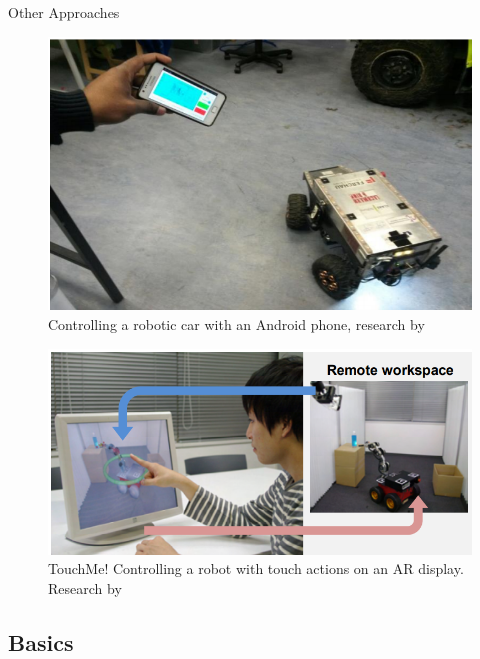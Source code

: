 \documentclass[t]{beamer}
\begin{document}
\begin{frame}{Other Approaches}

\begin{minipage}{0.49\linewidth}
\begin{figure}
	\includegraphics[width=\linewidth]{assets/pres/akupati.png}
	\caption{Controlling a robotic car with an Android phone, research by \citeauthor{Akupati2017}\cite{Akupati2017}}
\end{figure}
\end{minipage}
\begin{minipage}{0.49\linewidth}
\begin{figure}
	\includegraphics[width=\linewidth]{assets/pres/touchme.png}
	\caption{TouchMe! Controlling a robot with touch actions on an AR display. Research by \citeauthor{Hashimoto2013}\cite{Hashimoto2013}}
\end{figure}
\end{minipage}

\end{frame}

\subsection{Basics}
\end{document}
